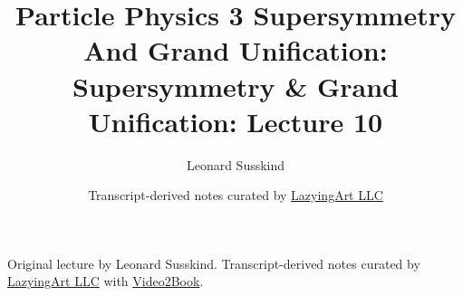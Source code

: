 \documentclass[11pt,oneside]{book}
\begin{document}
\frontmatter
\title{Particle Physics 3 Supersymmetry And Grand Unification: Supersymmetry \& Grand Unification: Lecture 10}
\author{Leonard Susskind}
\date{Transcript-derived notes curated by \href{https://lazying.art}{LazyingArt LLC}}
\maketitle
\begin{center}
\small Original lecture by Leonard Susskind. Transcript-derived notes curated by \href{https://lazying.art}{LazyingArt LLC} with \href{https://github.com/lachlanchen/Video2Book}{Video2Book}.
\end{center}
\clearpage
\mainmatter

\end{document}
